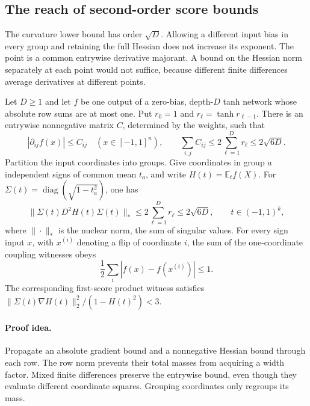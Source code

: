 \subsection{The reach of second-order score bounds}
\label{sec:critical-score-ceiling}

The curvature lower bound has order $\sqrt D$. Allowing a different
input bias in every group and retaining the full Hessian does not
increase its exponent. The point is a common entrywise derivative
majorant. A bound on the Hessian norm separately at each point would
not suffice, because different finite differences average derivatives
at different points.

\begin{proposition}
\label{prop:critical-hessian-majorant}
Let $D\ge1$ and let $f$ be one output of a zero-bias, depth-$D$ tanh network whose
absolute row sums are at most one. Put $r_0=1$ and
$r_\ell=\tanh r_{\ell-1}$. There is an entrywise nonnegative
matrix $C$, determined by the weights, such that
\[
 |\partial_{ij}f(x)|\le C_{ij}
 \quad(x\in[-1,1]^n),\qquad
 \sum_{i,j}C_{ij}\le2\sum_{\ell=1}^D r_\ell
                    \le2\sqrt{6D}.
\]
Partition the input coordinates into groups. Give coordinates in group
$a$ independent signs of common mean $t_a$, and write
$H(t)=\mathbb E_t f(X)$. For
$\Sigma(t)=\operatorname{diag}(\sqrt{1-t_a^2})$, one has
\[
 \|\Sigma(t)D^2H(t)\Sigma(t)\|_*
 \le2\sum_{\ell=1}^D r_\ell\le2\sqrt{6D},
 \qquad t\in(-1,1)^k,
\]
where $\|\cdot\|_*$ is the nuclear norm, the sum of singular values.
For every sign input $x$, with $x^{(i)}$ denoting a flip of coordinate $i$,
the sum of the one-coordinate coupling witnesses obeys
\[
 \frac12\sum_i|f(x)-f(x^{(i)})|\le1.
\]
The corresponding first-score product witness satisfies
$\|\Sigma(t)\nabla H(t)\|_2^2/(1-H(t)^2)<3$.
\end{proposition}

\paragraph{Proof idea.}
Propagate an absolute gradient bound and a nonnegative Hessian bound
through each row. The row norm prevents their total masses from
acquiring a width factor. Mixed finite differences preserve the
entrywise bound, even though they evaluate different coordinate
squares. Grouping coordinates only regroups its mass.

